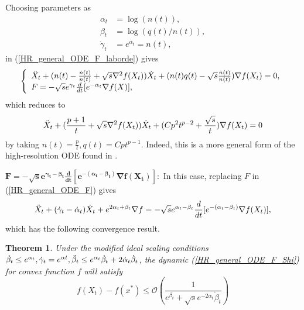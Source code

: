 \documentclass{article}
\theoremstyle{plain}
\newtheorem{thm}{\textbf{Theorem}}
\theoremstyle{definition}
\theoremstyle{remark}
\begin{document}
Choosing parameters as
\begin{align}\label{prams_general}
        \alpha_t&=\log (n(t)),\nonumber\\
    \beta_t&=\log (q(t)/n(t)),\\
    \dot\gamma_t&=e^{\alpha_t}=n(t),\nonumber
\end{align}
in (\ref{HR_general_ODE_F_laborde}) gives
\begin{align}\label{HR_cnts_general_npq_laborde}
\left\{
\begin{array}{l}
     \Ddot{X}_t + (n(t)-\frac{\dot n(t)}{n(t)}+\sqrt{s}\nabla^2 f(X_t))\dot{X}_t+(n(t)q(t)-\sqrt{s} \frac{\dot n(t)}{n(t)})\nabla f(X_t)=0,   \\
    F = -\sqrt{s}e^{\gamma_t}\frac{d}{dt}[e^{-\alpha_t}\nabla f(X)],  
\end{array}\right.
\end{align}
which reduces to 
\begin{align}\label{HR_cnts_general_npq2}
     \Ddot{X}_t + (\frac{p+1}{t}+\sqrt{s}\nabla^2 f(X_t))\dot{X}_t+(Cp^2t^{p-2}+\frac{\sqrt{s}}{t})\nabla f(X_t)=0
\end{align}
by taking $n(t)=\frac{p}{t},q(t)=Cpt^{p-1}$. Indeed, this is a more general form of the high-resolution ODE found in \cite{pmlr-v108-laborde20a}.

     $ \boldsymbol{F = -\sqrt{s}e^{\gamma_t-\beta_t}\frac{d}{dt}\left[e^{-(\alpha_t-\beta_t)}\nabla f(X_t)\right]}:$
    In this case, replacing $F$ in (\ref{HR_general_ODE_F}) gives
    \begin{align}\label{HR_general_ODE_F_Shi}
    \Ddot{X}_t + (\dot{\gamma}_t-\dot{\alpha}_t)\dot{X}_t+e^{2\alpha_t+\beta_t}\nabla f = -\sqrt{s}e^{\alpha_t-\beta_t}\frac{d}{dt}[e^{-(\alpha_t-\beta_t)}\nabla f(X_t)],
\end{align}
which has the following convergence result.
\begin{thm}\label{Theorem_ODE_Shi}
Under the modified ideal scaling conditions $\dot\beta_t\leq e^{\alpha_t}, \dot\gamma_t=e^{\alpha t}, \Ddot{\beta}_t\leq e^{\alpha_t}\dot \beta_t + 2\dot \alpha_t \dot \beta_t$, the dynamic (\ref{HR_general_ODE_F_Shi}) for convex function $f$ will satisfy 
$$f(X_t)-f(x^*)\leq \mathcal{O}(\frac{1}{e^{\beta_t}+\sqrt{s}e^{-2\alpha_t}\dot \beta_t})$$
\end{thm}
\end{document}
